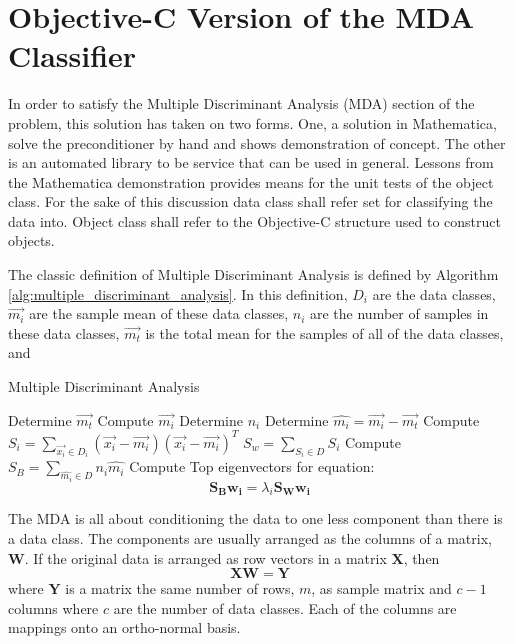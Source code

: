 \documentclass[11pt]{article}
\begin{document}
\section{Objective-C Version of the MDA Classifier}
In order to satisfy the Multiple Discriminant Analysis (MDA) section of the problem, this solution has taken on two forms.  One, a solution in Mathematica, solve the preconditioner by hand and shows demonstration of concept.  The other is an automated library to be service that can be used in general.  Lessons from the Mathematica demonstration provides means for the unit tests of the object class.  For the sake of this discussion data class shall refer set for classifying the data into.  Object class shall refer to the Objective-C structure used to construct objects. 

The classic definition of Multiple Discriminant Analysis is defined by Algorithm \ref{alg:multiple_discriminant_analysis}.  In this definition, $D_i$ are the data classes, $\vec{m_i}$ are the sample mean of these data classes, $n_i$ are the number of samples in these data classes, $\vec{m_t}$ is the total mean for the samples of all of the data classes, and 

\begin{algorithm}
\caption{Multiple Discriminant Analysis}
\label{alg:multiple_discriminant_analysis}
\begin{algorithmic}
	\STATE Determine $\vec{m_t}$
		\STATE Compute $\vec{m_i}$
		\STATE Determine $n_i$
		\STATE Determine $\hat{m_i} = \vec{m_i} - \vec{m_t}$
		\STATE Compute $S_i = \sum_{\vec{x_i} \in D_i} (\vec{x_i} - \vec{m_i} )(\vec{x_i} - \vec{m_i} )^T $
	\ENDFOR
	\STATE $S_w = \sum _{S_i \in D} S_i$
	\STATE Compute $S_B = \sum_{\hat{m_i} \in D} n_i \hat{m_i}$
	\STATE Compute Top eigenvectors for equation: 
	\[
	\mathbf{S_B} \mathbf{w_i} = \lambda_i \mathbf{S_W} \mathbf{w_i}
	\]
\end{algorithmic}
\end{algorithm}


The MDA is all about conditioning the data to one less component than there is a data class.  The components are usually arranged as the columns of a matrix, $\mathbf{W}$.  If the original data is arranged as row vectors in a matrix $\mathbf{X}$, then
\begin{equation}
\mathbf{XW} = \mathbf{Y}
\end{equation}
where $\mathbf{Y}$ is a matrix the same number of rows, $m$, as sample matrix and $c-1$ columns where $c$ are the number of data classes.  Each of the columns are mappings onto an ortho-normal basis.  
\end{document}
